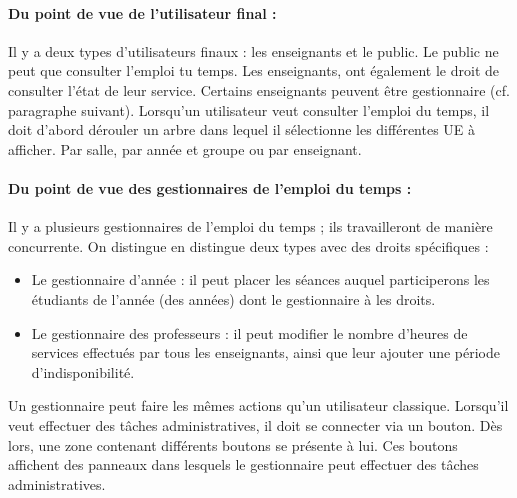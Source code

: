 \documentclass{article}
\begin{document}
\paragraph{Du point de vue de l'utilisateur final :\\}
Il y a deux types d'utilisateurs finaux : les enseignants et le public.
Le public ne peut que consulter l'emploi tu temps.
Les enseignants, ont également le droit de consulter l'état de leur service. Certains enseignants peuvent être gestionnaire (cf. paragraphe suivant).
Lorsqu'un utilisateur veut consulter l'emploi du temps, il doit d'abord dérouler un arbre dans lequel il sélectionne les différentes UE à afficher. Par salle, par année et groupe ou par enseignant.

\paragraph{Du point de vue des gestionnaires de l'emploi du temps :\\}
Il y a plusieurs gestionnaires de l'emploi du temps ; ils travailleront de manière concurrente. On distingue en distingue deux types avec des droits spécifiques :
\begin{itemize}
\item Le gestionnaire d'année : il peut placer les séances auquel participerons les étudiants de l'année (des années) dont le gestionnaire à les droits.
\item Le gestionnaire des professeurs : il peut modifier le nombre d'heures de services effectués par tous les enseignants, ainsi que leur ajouter une période d'indisponibilité.
\end{itemize}

Un gestionnaire peut faire les mêmes actions qu'un utilisateur classique. Lorsqu'il veut effectuer des tâches administratives, il doit se connecter via un bouton. Dès lors, une zone contenant différents boutons se présente à lui. Ces boutons affichent des panneaux dans lesquels le gestionnaire peut effectuer des tâches administratives.
\end{document}
